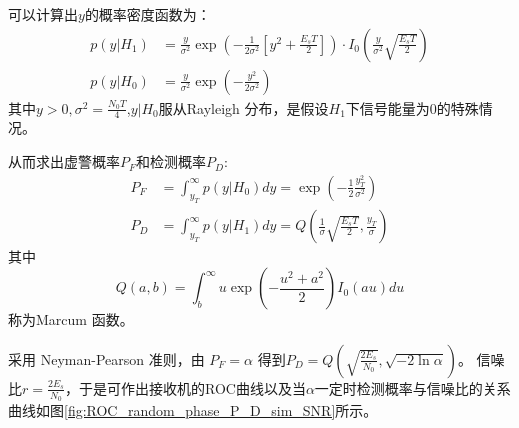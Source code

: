 \documentclass{article}
\begin{document}
\begin{enumerate}
\begin{enumerate}[label=(\alph*)]
可以计算出$y$的概率密度函数为：
\begin{align}
p(y | H_1) & = \frac{y}{\sigma^2} \exp\left(-\frac{1}{2\sigma^2}\left[y^2+\frac{E_sT}{2}\right]\right)\cdot I_0\left(\frac{y}{\sigma^2}\sqrt{\frac{E_sT}{2}}\right) \\
p(y | H_0) & = \frac{y}{\sigma^2} \exp\left(-\frac{y^2}{2\sigma^2}\right)
\end{align}
其中$y>0,\sigma^2=\frac{N_0 T}{4}$,$y|H_0$服从Rayleigh 分布，是假设$H_1$下信号能量为0的特殊情况。

从而求出虚警概率$P_F$和检测概率$P_D$:
\begin{align}
P_F & = \int_{y_T}^{\infty} p(y|H_0)dy = \exp\left(-\frac{1}{2}\frac{y_T^2}{\sigma^2}\right) \\
P_D & = \int_{y_T}^{\infty} p(y|H_1)dy = Q\left(\frac{1}{\sigma}\sqrt{\frac{E_s T}{2}},\frac{y_T}{\sigma}\right)\label{eq:random_signal_PD}
\end{align}
其中
$$
Q(a,b) = \int_b^{\infty} u\exp\left(-\frac{u^2+a^2}{2}\right)I_0(au)du
$$
称为Marcum 函数。

采用 Neyman-Pearson 准则，由 $P_F =\alpha $ 得到$P_D=Q(\sqrt{\frac{2E_s}{N_0}},\sqrt{-2\ln \alpha})$。
信噪比$r=\frac{2E_s}{N_0}$，于是可作出接收机的ROC曲线以及当$\alpha$一定时检测概率与信噪比的关系曲线如图\ref{fig:ROC_random_phase_P_D_sim_SNR}所示。


\end{enumerate}
\end{enumerate}
\end{document}

